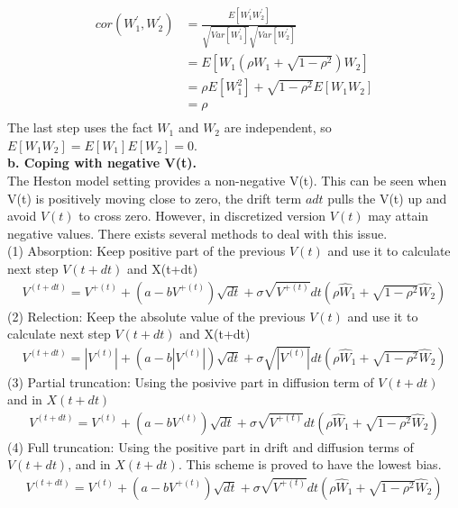 \documentclass[a4paper]{article}
\begin{document}
\begin{align*}
	cor(W_1^{'}, W_2^{'}) & = \frac{E[W_1^{'}W_2^{'}]}{\sqrt{Var[W_1^{'}]}\sqrt{Var[W_2^{'}]}}\\
		      & = E[W_1 (\rho W_1 +\sqrt{1 - \rho^2})W_2] \\
		      & = \rho E[W_1^2] + \sqrt{1 - \rho^2} E[W_1 W_2] \\
		      & = \rho \\
\end{align*}
The last step uses the fact $W_1$ and $W_2$ are independent, so $E[W_1 W_2] = E[W_1] E[W_2] = 0$.\\
{\bf b. Coping with negative V(t). } \\
The Heston model setting provides a non-negative V(t). This can be seen when V(t) is positively moving close to zero, the drift term $adt$ pulls the V(t) up and avoid $V(t)$ to cross zero. However, in discretized version $V(t)$ may attain negative values. There exists several methods to deal with this issue.\\
(1) Absorption: Keep positive part of the previous $V(t)$ and use it to calculate next step $V(t+dt)$ and X(t+dt)\\
\begin{align*}
	V^{(t + dt)} = V^{+(t)} + (a - b V^{+(t)}) \sqrt{dt} + \sigma \sqrt{V^{+(t)}} dt (\rho \hat W_1
	+ \sqrt{1 - \rho^2} \hat W_2)
\end{align*}
(2) Relection: Keep the absolute value of the previous $V(t)$ and use it to calculate next step $V(t+dt)$ and X(t+dt)\\
\begin{align*}
	V^{(t + dt)} = |V^{(t)}| + (a - b |V^{(t)}|) \sqrt{dt} + \sigma \sqrt{|V^{(t)}|}  dt (\rho \hat W_1
	+ \sqrt{1 - \rho^2} \hat W_2)
\end{align*}
(3) Partial truncation: Using the posivive part in diffusion term of $V(t+dt)$ and in $X(t + dt)$\\
\begin{align*}
	V^{(t + dt)} = V^{(t)} + (a - b V^{(t)}) \sqrt{dt} + \sigma \sqrt{V^{+(t)}} dt (\rho \hat W_1
	+ \sqrt{1 - \rho^2} \hat W_2)
\end{align*}
(4) Full truncation\cite{fulltruncation}: Using the positive part in drift and diffusion terms of $V(t + dt)$, and in $X(t + dt)$. 
This scheme is proved to have the lowest bias.
\begin{align*}
	V^{(t + dt)} = V^{(t)} + (a - b V^{+(t)}) \sqrt{dt} + \sigma \sqrt{V^{+(t)}} dt (\rho \hat W_1
	+ \sqrt{1 - \rho^2} \hat W_2)
\end{align*}
\end{document}
